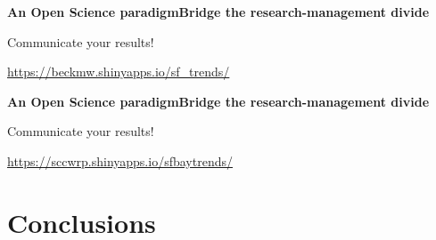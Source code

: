 \documentclass[serif]{beamer}\usepackage[]{graphicx}\usepackage[]{color}
\begin{document}
\begin{frame}{\textbf{An Open Science paradigm}}{\textbf{Bridge the research-management divide}}
\centerline{Communicate your results!}
\centerline{{\small \url{https://beckmw.shinyapps.io/sf_trends/}}}
\begin{center}
\end{center}
\end{frame}

\begin{frame}{\textbf{An Open Science paradigm}}{\textbf{Bridge the research-management divide}}
\centerline{Communicate your results!}
\centerline{{\small \url{https://sccwrp.shinyapps.io/sfbaytrends/}}}
\begin{center}
\end{center}
\end{frame}

\section{Conclusions}
\end{document}

